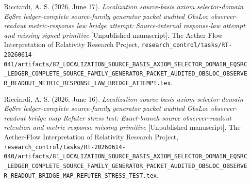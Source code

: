 \documentclass[11pt]{article}
\begin{document}
Ricciardi, A. S. (2026, June 17). \emph{Localization source-basis
axiom selector-domain EqSrc ledger-complete source-family generator
packet audited ObsLoc observer-readout metric-response law bridge
attempt: Source-internal response-law attempt and missing signed
primitive} [Unpublished manuscript]. The Aether-Flow Interpretation
of Relativity Research Project,
\texttt{research\_control/tasks/RT-20260614-041/artifacts/82\_LOCALIZATION\_SOURCE\_BASIS\_AXIOM\_SELECTOR\_DOMAIN\_EQSRC\_LEDGER\_COMPLETE\_SOURCE\_FAMILY\_GENERATOR\_PACKET\_AUDITED\_OBSLOC\_OBSERVER\_READOUT\_METRIC\_RESPONSE\_LAW\_BRIDGE\_ATTEMPT.tex}.

Ricciardi, A. S. (2026, June 16). \emph{Localization source-basis
axiom selector-domain EqSrc ledger-complete source-family generator
packet audited ObsLoc observer-readout bridge map Refuter stress
test: Exact-branch source observer-readout retention and
metric-response missing primitive} [Unpublished manuscript]. The
Aether-Flow Interpretation of Relativity Research Project,
\texttt{research\_control/tasks/RT-20260614-040/artifacts/81\_LOCALIZATION\_SOURCE\_BASIS\_AXIOM\_SELECTOR\_DOMAIN\_EQSRC\_LEDGER\_COMPLETE\_SOURCE\_FAMILY\_GENERATOR\_PACKET\_AUDITED\_OBSLOC\_OBSERVER\_READOUT\_BRIDGE\_MAP\_REFUTER\_STRESS\_TEST.tex}.
\end{document}
